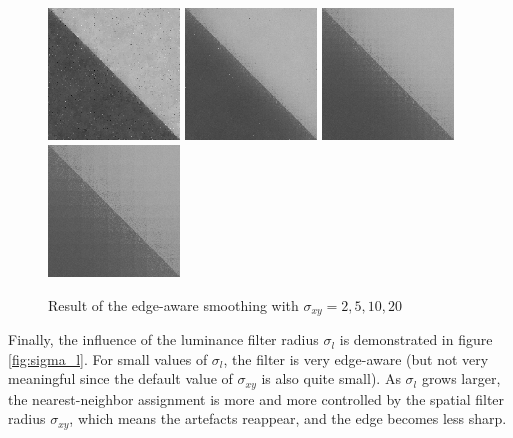 \documentclass{article}
\begin{document}
\begin{figure}
    \centering
    \includegraphics[width=3.5cm]{../code/results/smoothing_diag_sigmaxy_100_2_50_new.png}
    \includegraphics[width=3.5cm]{../code/results/smoothing_diag_sigmaxy_100_5_50_new.png}
    \includegraphics[width=3.5cm]{../code/results/smoothing_diag_sigmaxy_100_10_50_new.png}
    \includegraphics[width=3.5cm]{../code/results/smoothing_diag_sigmaxy_100_20_50_new.png}
    \caption{Result of the edge-aware smoothing with $\sigma_{xy} = 2, 5, 10, 20$}
    \label{fig:sigma_xy}
\end{figure}

\medskip

Finally, the influence of the luminance filter radius $\sigma_{l}$ is demonstrated in figure \ref{fig:sigma_l}. For small values of $\sigma_l$, the filter is very edge-aware (but not very meaningful since the default value of $\sigma_{xy}$ is also quite small). As $\sigma_l$ grows larger, the nearest-neighbor assignment is more and more controlled by the spatial filter radius $\sigma_{xy}$, which means the artefacts reappear, and the edge becomes less sharp.
\end{document}
